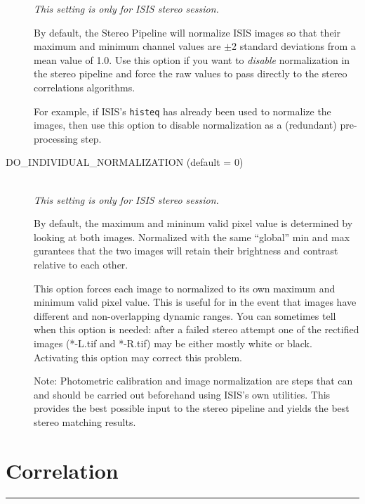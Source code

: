 \begin{description}
  \emph{This setting is only for ISIS stereo session.}

  By default, the Stereo Pipeline will normalize ISIS images so that
  their maximum and minimum channel values are $\pm$2 standard
  deviations from a mean value of 1.0.  Use this option if you want to
  {\em disable} normalization in the stereo pipeline and force the raw
  values to pass directly to the stereo correlations algorithms.

  For example, if ISIS's \texttt{histeq} has already been used to
  normalize the images, then use this option to disable normalization
  as a (redundant) pre-processing step.
  

\item[DO\_INDIVIDUAL\_NORMALIZATION \textnormal (default = 0)] \hfill \\

  \emph{This setting is only for ISIS stereo session.}

  By default, the maximum and mininum valid pixel value is determined
  by looking at both images.  Normalized with the same ``global'' min
  and max gurantees that the two images will retain their brightness
  and contrast relative to each other.  

  This option forces each image to normalized to its own maximum and
  minimum valid pixel value. This is useful for in the event that
  images have different and non-overlapping dynamic ranges. You can
  sometimes tell when this option is needed: after a failed stereo
  attempt one of the rectified images (*-L.tif and *-R.tif) may be
  either mostly white or black.  Activating this option may correct
  this problem.

  Note: Photometric calibration and image normalization are steps that
  can and should be carried out beforehand using ISIS's own utilities.
  This provides the best possible input to the stereo pipeline and
  yields the best stereo matching results.

\end{description}


\section{Correlation}
\hrule
\bigskip


